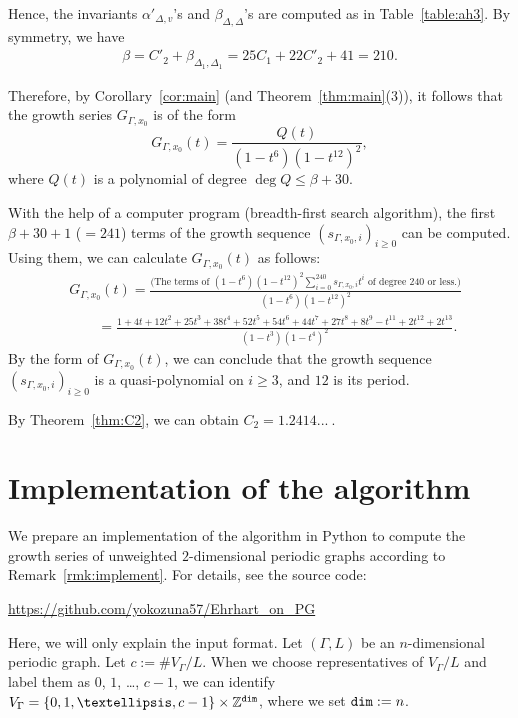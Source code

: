 \documentclass[11pt]{article}
\theoremstyle{definition}
\numberwithin{equation}{section}
\begin{document}
Hence, the invariants $\alpha ' _{\Delta, v}$'s and $\beta_{\Delta, \Delta}$'s are computed as in Table~\ref{table:ah3}. 
By symmetry, we have 
\begin{align*}
\beta 
= C'_2 + \beta _{\Delta_1, \Delta_1}
= 25 C_1 + 22 C'_2 + 41
= 210. 
\end{align*}

Therefore, by Corollary~\ref{cor:main} (and Theorem~\ref{thm:main}(3)), 
it follows that the growth series $G_{\Gamma, x_0}$ is of the form 
\[
G_{\Gamma, x_0}(t) = \frac{Q(t)}{(1-t^6)(1-t^{12})^2}, 
\]
where $Q(t)$ is a polynomial of degree $\deg Q \le \beta + 30$. 

With the help of a computer program (breadth-first search algorithm), 
the first $\beta + 30 + 1$ ($= 241$) terms of the growth sequence $(s_{\Gamma, x_0, i})_{i \ge 0}$ can be computed. 
Using them, we can calculate $G_{\Gamma, x_0}(t)$ as follows:  
{\small
\begin{align*}
&G_{\Gamma, x_0}(t) 
=  \frac{\bigl( \text{The terms of $(1-t^6)(1-t^{12})^2 \sum _{i = 0}^{240}  s_{\Gamma, x_0, i} t^i $ of degree $240$ or less.} \bigr)}{(1-t^6)(1-t^{12})^2} \\
&\qquad = \frac{1 + 4t + 12t^2 + 25t^3 +38t^4 + 52t^5 + 54t^6 + 44t^7 + 27t^8 + 8t^9 - t^{11} + 2 t^{12} + 2 t^{13}}{(1- t^3)(1-t^4)^2}. 
\end{align*}
\normalsize}By the form of $G_{\Gamma, x_0}(t)$, 
we can conclude that the growth sequence $(s_{\Gamma, x_0, i})_{i \ge 0}$ is a quasi-polynomial on $i \ge 3$, 
and $12$ is its period. 

\begin{rmk}
By Theorem~\ref{thm:C2}, we can obtain $C_2 = 1.2414...\ $. 
\end{rmk}


\appendix
\section{Implementation of the algorithm}\label{section:a}
We prepare an implementation of the algorithm in {\sf Python} to compute the growth series of unweighted $2$-dimensional periodic graphs according to Remark~\ref{rmk:implement}. 
For details, see the source code:
\begin{center}
\url{https://github.com/yokozuna57/Ehrhart_on_PG}
\end{center}
Here, we will only explain the input format. 
Let $(\Gamma, L)$ be an $n$-dimensional periodic graph. 
Let $c :=\# V_\Gamma / L$. 
When we choose representatives of $V_\Gamma / L$ and label them as $0$, $1$, \dots, $c-1$, 
we can identify $V_{\Gamma} = \{0,1,\ldots, c-1\} \times \mathbb{Z}^{\tt dim}$, where we set ${\tt dim} := n$. 
\end{document}
